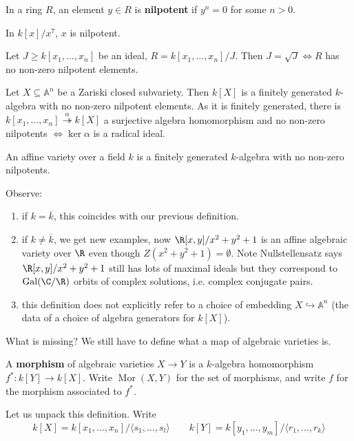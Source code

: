 \documentclass{article}
\newcommand{\A}{\mathbb{A}}
\DeclareMathOperator{\Mor}{Mor}
\DeclareMathOperator{\Gal}{Gal}
\begin{document}
\begin{defi}[Nilpotent]
    In a ring $R$, an element $y \in R$ is \textbf{nilpotent} if $y^n = 0$ for some $n > 0$.
\end{defi}
\begin{eg}
    In $k[x]/x^7$, $x$ is nilpotent.
\end{eg}
\begin{ex}
    Let $J \geq k[x_1, \dotsc, x_n]$ be an ideal, $R = k[x_1, \dotsc, x_n]/J$. Then $J = \sqrt{J} \iff R$ has no non-zero nilpotent elements.
\end{ex}
\begin{cor}
    Let $X \subseteq \A^n$ be a Zariski closed subvariety.
    Then $k[X]$ is a finitely generated $k$-algebra with no non-zero nilpotent elements.
    As it is finitely generated, there is $k[x_1, \dotsc, x_n] \overset{\alpha}{\twoheadrightarrow}k[X]$ a surjective algebra homomorphism and no non-zero nilpotents $\iff \ker \alpha$ is a radical ideal.
\end{cor}
\begin{defi}
    An affine variety over a field $k$ is a finitely generated $k$-algebra with no non-zero nilpotents.
\end{defi}
Observe:
\begin{enumerate}[label=(\roman*)]
    \item if $k = \overline{k}$, this coincides with our previous definition.
    \item if $k \neq \overline{k}$, we get new examples, now $\R[x,y]/x^2 + y^2 + 1$ is an affine algebraic variety over $\R$ even though $Z(x^2 + y^2 + 1) = \emptyset$.
        Note Nullstellensatz says $\R[x,y]/x^2 + y^2 + 1$ still has lots of maximal ideals but they correspond to $\Gal(\C/\R)$ orbits of complex solutions, i.e. complex conjugate pairs.
    \item this definition does not explicitly refer to a choice of embedding $X \hookrightarrow \A^n$ (the data of a choice of algebra generators for $k[X]$).
\end{enumerate}
What is missing? We still have to define what a map of algebraic varieties is.
\begin{defi}[Morphism]
    A \textbf{morphism} of algebraic varieties $X \to Y$ is a $k$-algebra homomorphism $f^*: k[Y] \to k[X]$. Write $\Mor(X, Y)$ for the set of morphisms, and write $f$ for the morphism associated to $f^*$.
\end{defi}
Let us unpack this definition.
Write
\begin{equation*}
    k[X] = k[x_1, \dotsc, x_n] / \langle s_1, \dotsc, s_l \rangle \qquad k[Y] = k[y_1, \dotsc, y_m] / \langle r_1, \dotsc, r_k \rangle
\end{equation*}
\end{document}
